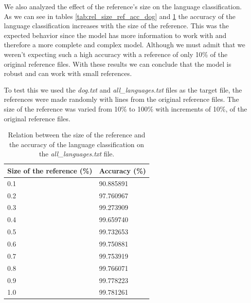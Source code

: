 \documentclass{article}
\begin{document}
We also analyzed the effect of the reference's size on the language classification.
As we can see in tables \ref{tab:rel_size_ref_acc_dog} and \ref{tab:rel_size_ref_acc_all} the accuracy of the language classification increases with the size of the reference.
This was the expected behavior since the model has more information to work with and therefore a more complete and complex model.
Although we must admit that we weren't expecting such a high accuracy with a reference of only 10\% of the original reference files.
With these results we can conclude that the model is robust and can work with small references.

To test this we used the \textit{dog.txt} and \textit{all\_languages.txt} files as the target file, the references were made randomly with lines from the original 
reference files. The size of the reference was varied from 10\% to 100\% with increments of 10\%, of the original reference files.

\begin{table}
    \centering
    \begin{tabular}{|l|l|}
    \hline
        Size of the reference (\%) & Accuracy (\%) \\ \hline
        0.1 & 90.885891 \\ \hline
        0.2 & 97.760967 \\ \hline
        0.3 & 99.273909 \\ \hline
        0.4 & 99.659740 \\ \hline
        0.5 & 99.732653 \\ \hline
        0.6 & 99.750881 \\ \hline
        0.7 & 99.753919 \\ \hline
        0.8 & 99.766071 \\ \hline
        0.9 & 99.778223 \\ \hline
        1.0 & 99.781261 \\ \hline
    \end{tabular}
    \caption{Relation between the size of the reference and the accuracy of the language classification on the \textit{all\_languages.txt} file.}
    \label{tab:rel_size_ref_acc_all}
\end{table}
\end{document}
